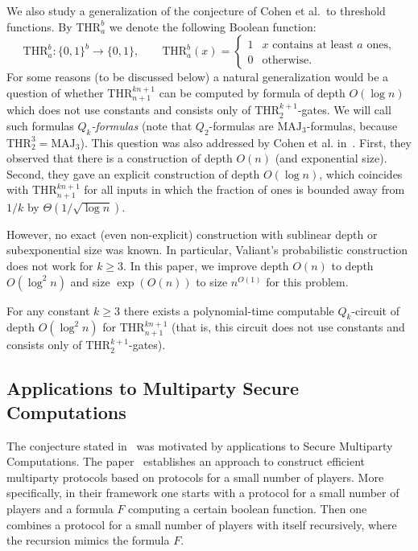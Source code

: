 \documentclass{toc}
\def\MAJ{\mathrm{MAJ}}
\def\THR{\mathrm{THR}}
\begin{document}
We also study a generalization of the conjecture of Cohen et al.~to threshold functions. By $\THR^b_a$ we denote the following Boolean function:
\[\THR^b_a\colon\{0, 1\}^b \to \{0, 1\}, \qquad \THR^b_a(x) = \begin{cases} 1 & \mbox{$x$ contains at least $a$ ones,} \\ 0 &\mbox{otherwise.} \end{cases}\]
For some reasons (to be discussed below) a natural generalization would be a question of whether $\THR^{kn + 1}_{n + 1}$ can be computed by 
%
formula of depth $O(\log n)$  %
which does not use constants and consists only of $\THR^{k+1}_2$-gates. We will call such formulas \emph{$Q_k$-formulas} (note that $Q_2$-formulas are $\MAJ_3$-formulas, because $\THR^{3}_2 = \MAJ_3$). This question was also addressed by Cohen et al. in~\cite{Cohen2013}. First, they observed that there is a construction of depth $O(n)$ (and exponential size).
%
Second,  %
they gave an explicit construction of depth $O(\log n)$, which coincides with $\THR^{kn + 1}_{n + 1}$ for all inputs in which the fraction of ones is bounded away from $1/k$ by $\Theta(1/\sqrt{\log n})$.



However, no exact (even non-explicit) construction with sublinear depth or
subexponential size was known. In particular, Valiant's probabilistic construction does not work for $k\ge 3$.
%
%
%
In this paper, we improve
%
depth $O(n)$ to depth $O(\log^2 n)$ and   %
%
size $\exp\left(O(n)\right)$ to size $n^{O(1)}$
for this problem.

\begin{theorem}
\label{cohen_2}
For any constant $k\ge 3$ 
there exists a polynomial-time computable
%
%
%
$Q_k$-circuit 
of depth  $O(\log^2 n)$  %
for $\THR^{k n + 1}_{n + 1}$ (that is, this circuit does not use constants
and consists only of $\THR^{k+1}_2$-gates).
\end{theorem}


\subsection{Applications to Multiparty Secure Computations}

The conjecture stated in~\cite{Cohen2013} was motivated by applications to Secure Multiparty Computations. The paper~\cite{Cohen2013} establishes an approach to construct efficient multiparty protocols based on protocols for a small number of players. More specifically, in their framework one starts with a protocol for a small number of players and a formula $F$ computing a certain boolean function. Then one combines a protocol for a small number of players with itself recursively, where the recursion mimics the formula $F$.
\end{document}
